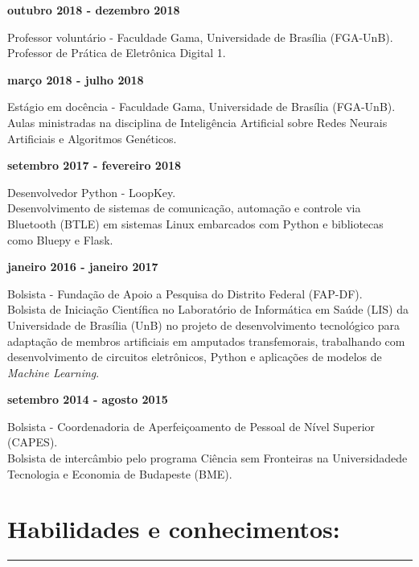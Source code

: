 \documentclass[11pt]{article}
\begin{document}
\textbf{outubro 2018 - dezembro 2018}
\begin{addmargin}{0.5cm}
Professor voluntário - Faculdade Gama, Universidade de Brasília (FGA-UnB).\\
Professor de Prática de Eletrônica Digital 1. \\
\end{addmargin}

\textbf{março 2018 - julho 2018}
\begin{addmargin}{0.5cm}
Estágio em docência - Faculdade Gama, Universidade de Brasília (FGA-UnB).\\
Aulas ministradas na disciplina de Inteligência Artificial sobre Redes 
Neurais Artificiais e Algoritmos Genéticos. \\
\end{addmargin}

\textbf{setembro 2017 - fevereiro 2018}
\begin{addmargin}{0.5cm}
Desenvolvedor Python - LoopKey.\\
Desenvolvimento de sistemas de comunicação, automação e controle via Bluetooth
(BTLE) em sistemas Linux embarcados com Python e bibliotecas como
Bluepy e Flask. \\
\end{addmargin}

\textbf{janeiro 2016 - janeiro 2017}
\begin{addmargin}{0.5cm}
Bolsista - Fundação de Apoio a Pesquisa do Distrito Federal (FAP-DF).\\
Bolsista de Iniciação Científica no Laboratório de Informática em Saúde (LIS)  da Universidade de
Brasília (UnB) no projeto
de desenvolvimento tecnológico para adaptação de membros artificiais em amputados transfemorais,
trabalhando com desenvolvimento de circuitos eletrônicos, Python e aplicações de modelos de 
\textit{Machine Learning}.\\

\end{addmargin}

    \textbf{setembro 2014 - agosto 2015}
    \begin{addmargin}{0.5cm}
        Bolsista - Coordenadoria de Aperfeiçoamento de Pessoal de Nível Superior (CAPES). \\
        Bolsista de intercâmbio pelo programa Ciência sem Fronteiras na Universidadede Tecnologia e Economia de Budapeste (BME). 
\end{addmargin}

\section{Habilidades e conhecimentos:}
\hrule \vspace{0.1cm}
\end{document}
